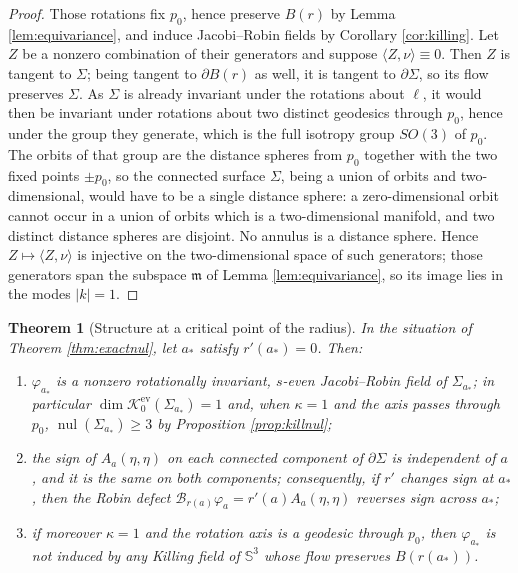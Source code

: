 \documentclass[10pt,a4paper]{amsart}
\newtheorem{theorem}{Theorem}[section]
\newcommand{\Sph}{\mathbb{S}}
\newcommand{\nul}{\operatorname{nul}}
\newcommand{\Ker}{\mathcal{K}}
\begin{document}
\begin{proof}
Those rotations fix $p_0$, hence preserve $B(r)$ by Lemma \ref{lem:equivariance}, and induce Jacobi--Robin fields by Corollary \ref{cor:killing}. Let $Z$ be a nonzero combination of their generators and suppose $\langle Z,\nu\rangle\equiv 0$. Then $Z$ is tangent to $\Sigma$; being tangent to $\partial B(r)$ as well, it is tangent to $\partial\Sigma$, so its flow preserves $\Sigma$. As $\Sigma$ is already invariant under the rotations about $\ell$, it would then be invariant under rotations about two distinct geodesics through $p_0$, hence under the group they generate, which is the full isotropy group $SO(3)$ of $p_0$. The orbits of that group are the distance spheres from $p_0$ together with the two fixed points $\pm p_0$, so the connected surface $\Sigma$, being a union of orbits and two-dimensional, would have to be a single distance sphere: a zero-dimensional orbit cannot occur in a union of orbits which is a two-dimensional manifold, and two distinct distance spheres are disjoint. No annulus is a distance sphere. Hence $Z\mapsto\langle Z,\nu\rangle$ is injective on the two-dimensional space of such generators; those generators span the subspace $\mathfrak{m}$ of Lemma \ref{lem:equivariance}, so its image lies in the modes $|k|=1$.
\end{proof}

\begin{theorem}[Structure at a critical point of the radius]\label{thm:fold}
In the situation of Theorem \ref{thm:exactnul}, let $a_*$ satisfy $r'(a_*)=0$. Then:
\begin{enumerate}
\item[\textup{(i)}] $\varphi_{a_*}$ is a nonzero rotationally invariant, $s$-even Jacobi--Robin field of $\Sigma_{a_*}$; in particular $\dim\Ker_0^{\mathrm{ev}}(\Sigma_{a_*})=1$ and, when $\kappa=1$ and the axis passes through $p_0$, $\nul(\Sigma_{a_*})\geq 3$ by Proposition \ref{prop:killnul};
\item[\textup{(ii)}] the sign of $A_a(\eta,\eta)$ on each connected component of $\partial\Sigma$ is independent of $a$, and it is the same on both components; consequently, if $r'$ changes sign at $a_*$, then the Robin defect $\mathcal{B}_{r(a)}\varphi_a=r'(a)A_a(\eta,\eta)$ reverses sign across $a_*$;
\item[\textup{(iii)}] if moreover $\kappa=1$ and the rotation axis is a geodesic through $p_0$, then $\varphi_{a_*}$ is not induced by any Killing field of $\Sph^3$ whose flow preserves $B(r(a_*))$.
\end{enumerate}
\end{theorem}
\end{document}

